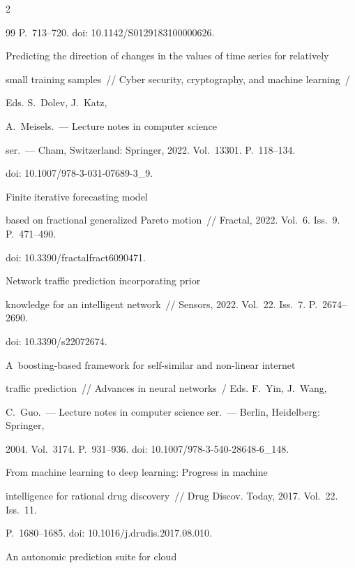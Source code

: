 \begin{multicols}{2}
{{\begin{thebibliography}{99}
P.~713--720. doi: 10.1142/S0129183100000626.




 Predicting the direction of changes in the values of time series for relatively 


small training samples~// Cyber security, cryptography, and machine learning~/


Eds. S.~Dolev, J.~Katz, 


A.~Meisels.~--- Lecture notes in computer science  


ser.~--- Cham, Switzerland: Springer, 2022. Vol.~13301. P.~118--134.  


doi: 10.1007/978-3-031-07689-3\_9. 




 Finite iterative forecasting model 


based on fractional generalized Pareto motion~// Fractal, 2022. Vol.~6. Iss.~9. P.~471--490.


doi: 10.3390/fractalfract6090471.




 Network traffic prediction incorporating prior 


knowledge for an intelligent network~// Sensors, 2022. Vol.~22. Iss.~7. P.~2674--2690.


doi: 10.3390/s22072674.




 A~boosting-based framework for self-similar and non-linear internet 


traffic prediction~// Advances in neural networks~/ Eds. F.~Yin, J.~Wang, 


C.~Guo.~--- Lecture notes in computer science ser.~--- Berlin, Heidelberg: Springer, 


2004. Vol.~3174. P.~931--936. doi: 10.1007/978-3-540-28648-6\_148.




 From machine learning to deep learning: Progress in machine 


intelligence for rational drug discovery~// Drug Discov. Today, 2017. Vol.~22. Iss.~11. 


P.~1680--1685. doi: 10.1016/j.drudis.2017.08.010.




 An autonomic prediction suite for cloud 



\end{thebibliography}}}
\end{multicols}
